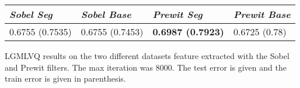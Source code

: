 \begin{minipage}{\linewidth}
\flushleft
{} \label{tab:results:LGMLVQ:var:8000} 
\begin{tabular}{llll}
\textit{Sobel Seg} & \textit{Sobel Base} & \textit{Prewit Seg}      & \textit{Prewit Base} \\
\hline
\hline
0.6755 (0.7535)    & 0.6755 (0.7453)     & \textbf{0.6987 (0.7923)} & 0.6725 (0.78)\\
\hline
\end{tabular}\par
\bigskip
LGMLVQ results on the two different datasets feature extracted with the Sobel and Prewit filters. The max iteration was 8000. The test error is given and the train error is given in parenthesis.
\end{minipage} 










